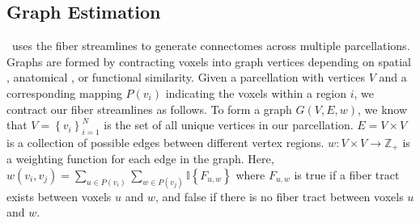 \documentclass[11pt]{article}
\begin{document}
\subsection{Graph Estimation}
\label{app:graphgen}

\ndmg~uses the fiber streamlines to generate connectomes across multiple
parcellations. Graphs are formed by contracting voxels into graph vertices depending on spatial \cite{glocal}, anatomical \cite{}, or functional \cite{} similarity.
Given a parcellation with vertices $V$ and a corresponding mapping $P(v_i)$ indicating the voxels within a region $i$, we contract our fiber streamlines as follows. To form a graph $G(V, E, w)$, we know that $V = \left\{v_i\right\}_{i=1}^N$ is the set of all unique vertices in our parcellation. $E = V \times V$ is a collection of possible edges between different vertex regions. $w: V \times V \rightarrow \mathbb{Z}_+$ is a weighting function for each edge in the graph. Here, $w(v_i, v_j) = \sum_{u \in P(v_i)}\sum_{w \in P(v_j)} \mathbb{I}\left\{ F_{u, w} \right\}$ where $F_{u, w}$ is true if a fiber tract exists between voxels $u$ and $w$, and false if there is no fiber tract between voxels $u$ and $w$.
\end{document}
